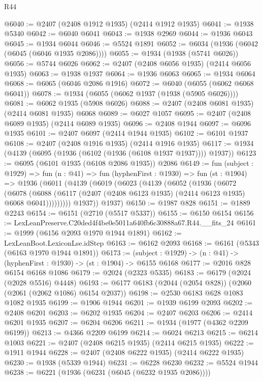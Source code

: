 \begin{lexlean}{R44}
\begin{coremodule}
@6040 := @2407 (@2408 @1912 @1935) (@2414 @1912 @1935)
@6041 := @1938 @5340
@6042 := @6040 @6041
@6043 := @1938 @2969
@6044 := @1936 @6043
@6045 := @1934 @6044
@6046 := @5524 @1891
@6052 := @6034 (@1936 (@6042 (@6045 (@6046 @1935 @2086))))
@6055 := @1934 (@1938 (@5741 @6026))
@6056 := @5744 @6026
@6062 := @2407 (@2408 @6056 @1935) (@2414 @6056 @1935)
@6063 := @1938 @1937
@6064 := @1936 @6063
@6065 := @1934 @6064
@6068 := @6065 (@6046 @2086 @1916)
@6072 := @6040 (@6055 (@6062 @6068 @6041))
@6078 := @1934 (@6055 (@6062 @1937 (@1938 (@5905 @6026))))
@6081 := @6062 @1935 (@5908 @6026)
@6088 := @2407 (@2408 @6081 @1935) (@2414 @6081 @1935) @6068
@6089 := @6027 @1057
@6095 := @2407 (@2408 @6089 @1935) (@2414 @6089 @1935)
@6096 := @2408 @1944
@6097 := @6096 @1935
@6101 := @2407 @6097 (@2414 @1944 @1935)
@6102 := @6101 @1937
@6108 := @2407 (@2408 @1916 @1935) (@2414 @1916 @1935)
@6117 := @1934 (@4139 (@6095 (@1936 (@6102 (@1936 (@6108 @1937 @1937)))) @1937))
@6123 := @6095 (@6101 @1935 (@6108 @2086 @1935)) @2086
@6149 := fun (subject : @1929) =>
  fun (n : @41) =>
  fun (hyphenFirst : @1930) =>
  fun (st : @1904) =>
  @1936
    (@6011
      (@4139
        (@6019
          (@6023
            (@4139
              (@6052
                (@1936
                  (@6072
                    (@6078
                      (@6088
                        (@6117 (@2407 (@2408 @6123 @1935) (@2414 @6123 @1935) @6068 @6041)))))))))
          @1937))
      @1937)
@6150 := @1987 @828
@6151 := @1889 @2243
@6154 := @6151 (@2710 (@5517 @5337))
@6155 := @6150 @6154
@6156 := LexLeanPreserve.C20ded4f4be0e5011a640fb6c30888a67.R44.__fits_24
@6161 := @1999 (@6156 @2093 @1970 @1944 @1891)
@6162 := LexLeanBoot.LexiconLse.idStep
@6163 := @6162 @2093
@6168 := @6161 (@5343 (@6163 @1970 @1944 @1891))
@6173 := (subject : @1929) -> (n : @41) -> (hyphenFirst : @1930) -> (st : @1904) -> @6155 @6168
@6177 := @2016 @828 @6154 @6168 @1086
@6179 := @2024 (@2323 @5335)
@6183 := @6179 (@2024 (@2028 @5516) @4448)
@6193 := @6177 @6183 (@2044 (@2054 @828)) (@2060 (@2061 (@2062 @1086) @6154 @2037))
@6198 := @2530 @6183 @628 @1083 @1082 @1935
@6199 := @1906 @1944
@6201 := @1939 @6199 @2093
@6202 := @2408 @6201
@6203 := @6202 @1935
@6204 := @2407 @6203
@6206 := @2414 @6201 @1935
@6207 := @6204 @6206
@6211 := @1934 (@1977 (@4362 @2209 @6199))
@6213 := @4366 @2209 @6199
@6214 := @6024 @6213
@6215 := @6214 @1003
@6221 := @2407 (@2408 @6215 @1935) (@2414 @6215 @1935)
@6222 := @1911 @1944
@6228 := @2407 (@2408 @6222 @1935) (@2414 @6222 @1935)
@6230 := @1938 (@5339 @1944)
@6231 := @6228 @6230
@6232 := @5524 @1944
@6238 := @6221 (@1936 (@6231 (@6045 (@6232 @1935 @2086))))

\end{coremodule}
\end{lexlean}
